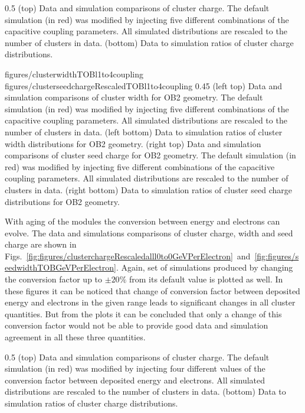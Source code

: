                  {0.5}       %
                 { (top) Data and simulation comparisons of cluster charge. The default simulation (in red) was modified by injecting five different combinations of the capacitive coupling parameters. All simulated distributions are rescaled to the number of clusters in data. (bottom) Data to simulation ratios of cluster charge distributions. }

                 {figures/clusterwidthTOBl1to4coupling}
                 {figures/clusterseedchargeRescaledTOBl1to4coupling} %
                 {0.45}       %
                 {(left top) Data and simulation comparisons of cluster width for OB2 geometry. The default simulation (in red) was modified by injecting five different combinations of the capacitive coupling parameters. All simulated distributions are rescaled to the number of clusters in data. (left bottom) Data to simulation ratios of cluster width distributions for OB2 geometry. (right top) Data and simulation comparisons of cluster seed charge for OB2 geometry. The default simulation (in red) was modified by injecting five different combinations of the capacitive coupling parameters. All simulated distributions are rescaled to the number of clusters in data. (right bottom) Data to simulation ratios of cluster seed charge distributions for OB2 geometry. }

With aging of the modules the conversion between energy and electrons can evolve. The data and simulations comparisons of cluster charge, width and seed charge are shown in Figs.~\ref{fig:figures/clusterchargeRescaledalll0to0GeVPerElectron}~and~\ref{fig:figures/seedwidthTOBGeVPerElectron}. Again, set of simulations produced by changing the conversion factor up to $\pm 20\%$ from its default value is plotted as well. In these figures it can be noticed that change of conversion factor between deposited energy and electrons in the given range leads to significant changes in all cluster quantities. But from the plots it can be concluded that only a change of this conversion factor would not be able to provide good data and simulation agreement in all these three quantities.

                 {0.5}       %
                 { (top) Data and simulation comparisons of cluster charge. The default simulation (in red) was modified by injecting four different values of the conversion factor between deposited energy and electrons. All simulated distributions are rescaled to the number of clusters in data. (bottom) Data to simulation ratios of cluster charge distributions. }

